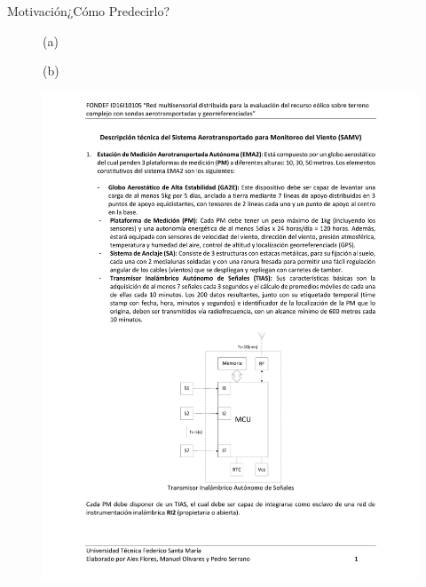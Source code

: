 \documentclass[mathserif]{beamer}
\begin{document}
\begin{frame}{Motivación}{¿Cómo Predecirlo?}
	\begin{figure}
		\begin{minipage}{0.5\linewidth}
			\centering
			(a)
		\end{minipage}%
		\begin{minipage}{0.5\linewidth}
			\centering
			(b)
		\end{minipage}%
		
		\begin{minipage}{0.5\linewidth}
			\centering
			\includegraphics[width=0.9\linewidth,page=3,trim={6cm 12.2cm 6cm 9.5cm},clip]{fig/01/descrp}
		\end{minipage}%
		\begin{minipage}{0.5\linewidth}
			\centering

\end{minipage}
\end{figure}
\end{frame}
\end{document}
